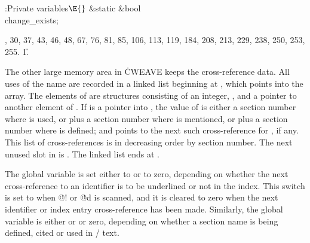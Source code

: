 \Y\B\4:Private variables\X${}\E{}$\6
\&{static} \&{bool} \\{change\_exists};\par
{}, 30, 37, 43, 46, 48, 67, 76, 81, 85, 106, 113, 119, 184, 208, 213, 229,
238, 250, 253, 255.
\U1.\fi

The other large memory area in \.{CWEAVE} keeps the cross-reference data.
All uses of the name  are recorded in a linked list beginning at
, which points into the  array. The elements
of 
are structures consisting of an integer, , and a pointer 
to another element of .  If  is a
pointer into ,
the value of  is either a section number where  is
used,
or  plus a section number where  is mentioned,
or  plus a section number where  is defined;
and  points to the next such cross-reference for ,
if any. This list of cross-references is in decreasing order by
section number. The next unused slot in  is .
The linked list ends at .

The global variable  is set either to 
or to zero,
depending on whether the next cross-reference to an identifier is to be
underlined or not in the index. This switch is set to  when
\.{@!} or \.{@d} is scanned, and it is cleared to zero when
the next identifier or index entry cross-reference has been made.
Similarly, the global variable  is either
 or  or zero, depending
on whether a section name is being defined, cited or used in \CEE/ text.


